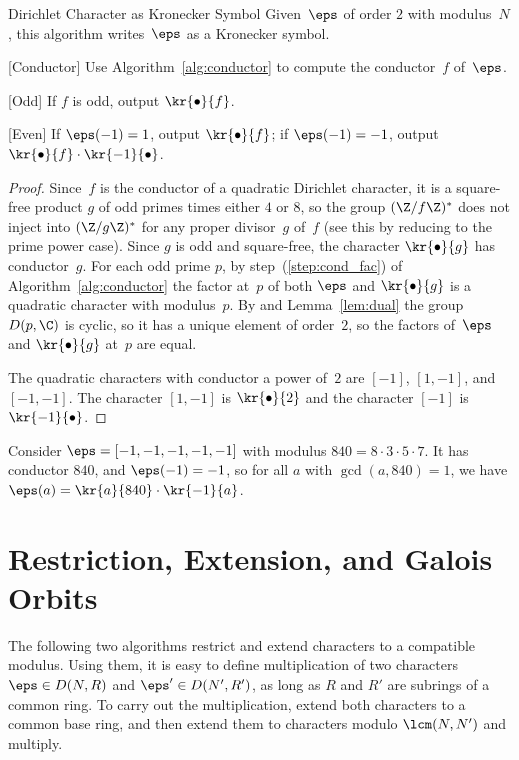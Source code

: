 \begin{algorithm}{Dirichlet Character as Kronecker Symbol}
  Given~$\eps$ of order $2$ with modulus~$N$, this
  algorithm writes~$\eps$ as a Kronecker symbol.
\begin{steps}
\item{}[Conductor] 
Use Algorithm~\ref{alg:conductor} to compute the conductor~$f$ of~$\eps$.
\item{}[Odd] If $f$ is odd, output $\kr{\bullet}{f}$.
\item{}[Even] If $\eps(-1)=1$, output $\kr{\bullet}{f}$;
if $\eps(-1)=-1$, output 
$\kr{\bullet}{f} \cdot \kr{-1}{\bullet}$.
\end{steps}
\end{algorithm}
\begin{proof}
Since~$f$ is the conductor of a quadratic Dirichlet character,
it is a square-free product $g$ of odd primes times either
$4$ or $8$, so the
group $(\Z/f\Z)^*$ does not inject into $(\Z/g\Z)^*$ for
any proper divisor~$g$ of~$f$ (see this by 
reducing to the prime power case).  
Since $g$ is odd and square-free, the character $\kr{\bullet }{g}$ 
has conductor~$g$.  
For each odd prime $p$, 
by step~(\ref{step:cond_fac}) of Algorithm~\ref{alg:conductor}
the factor at~$p$ of both $\eps$ and $\kr{\bullet}{g}$ 
is a quadratic character with modulus~$p$.  
By  and Lemma~\ref{lem:dual} 
the group $D(p,\C)$ is cyclic, so it has a unique element
of order~$2$, so 
the factors of~$\eps$ and $\kr{\bullet}{g}$ at~$p$ are equal.

The quadratic characters with conductor a power of~$2$ are $[-1]$,
$[1,-1]$, and $[-1,-1]$.  The character $[1,-1]$ is $\kr{\bullet}{2}$
and the character $[-1]$ is $\kr{-1}{\bullet}$.
\end{proof}

\begin{example}
  Consider $\eps=[-1,-1,-1,-1,-1]$ with modulus
  $840=8\cdot 3\cdot 5\cdot 7$.  It has conductor $840$, and
  $\eps(-1)=-1$, so for all $a$ with $\gcd(a,840)=1$, we have $\eps(a)
  = \kr{a}{840}\cdot \kr{-1}{a}$.
\end{example}


\section{Restriction, Extension, and Galois Orbits}\label{sec:dirresext}
The following two algorithms restrict and extend characters to a
compatible modulus.  Using them, it is easy to define multiplication of
two characters $\eps\in D(N,R)$ and $\eps'\in D(N',R')$, as long as
$R$ and $R'$ are subrings of a common ring.  To carry out the
multiplication, extend both characters to a common base ring,
and then extend them to characters modulo $\lcm(N,N')$ and multiply.

